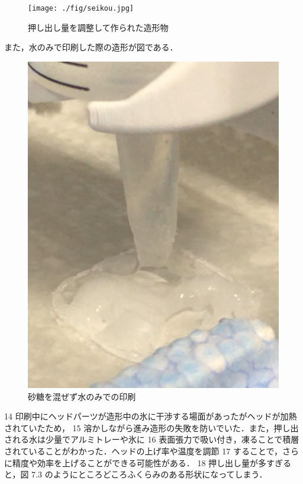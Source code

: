  \begin{figure}[H]
    \centering
    \texttt{[image: ./fig/seikou.jpg]}
    \caption{押し出し量を調整して作られた造形物}
    \label{fig:printer2}
  \end{figure}

また，水のみで印刷した際の造形が図である．

\begin{figure}[H]
    \centering
    \includegraphics[width=12truecm]{./fig/mizu.png}
    \caption{砂糖を混ぜず水のみでの印刷}
    \label{fig:printer2}
  \end{figure}




14 印刷中にヘッドパーツが造形中の氷に干渉する場面があったがヘッドが加熱されていたため，
15 溶かしながら進み造形の失敗を防いでいた．また，押し出される水は少量でアルミトレーや氷に
16 表面張力で吸い付き，凍ることで積層されていることがわかった．ヘッドの上げ率や温度を調節
17 することで，さらに精度や効率を上げることができる可能性がある．
18 押し出し量が多すぎると，図 7.3 のようにところどころふくらみのある形状になってしまう．



